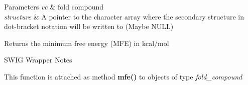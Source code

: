 \begin{DoxyParams}{Parameters}
{\em vc} & fold compound \\
\hline
{\em structure} & A pointer to the character array where the secondary structure in dot-\/bracket notation will be written to (Maybe N\+U\+LL)\\
\hline
\end{DoxyParams}
\begin{DoxyReturn}{Returns}
the minimum free energy (M\+FE) in kcal/mol
\end{DoxyReturn}
\begin{DoxyRefDesc}{S\+W\+I\+G Wrapper Notes}
\item[\hyperlink{wrappers__wrappers000074}{S\+W\+I\+G Wrapper Notes}]This function is attached as method {\bfseries mfe()} to objects of type {\itshape fold\+\_\+compound} \end{DoxyRefDesc}
